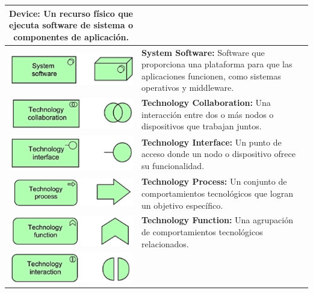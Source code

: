 \begin{longtable}{|c|p{8cm}|}
\textbf{Device:} Un recurso físico que ejecuta software de sistema o componentes de aplicación. \\
\hline
\includegraphics{anexos/ARCHI/technology/software.png} & 
\textbf{System Software:} Software que proporciona una plataforma para que las aplicaciones funcionen, como sistemas operativos y middleware. \\
\hline
\includegraphics{anexos/ARCHI/technology/collaboration.png} & 
\textbf{Technology Collaboration:} Una interacción entre dos o más nodos o dispositivos que trabajan juntos. \\
\hline
\includegraphics{anexos/ARCHI/technology/interface.png} & 
\textbf{Technology Interface:} Un punto de acceso donde un nodo o dispositivo ofrece su funcionalidad. \\
\hline
\includegraphics{anexos/ARCHI/technology/process.png} & 
\textbf{Technology Process:} Un conjunto de comportamientos tecnológicos que logran un objetivo específico. \\
\hline
\includegraphics{anexos/ARCHI/technology/function.png} & 
\textbf{Technology Function:} Una agrupación de comportamientos tecnológicos relacionados. \\
\hline
\includegraphics{anexos/ARCHI/technology/interaction.png} & 

\end{longtable}
